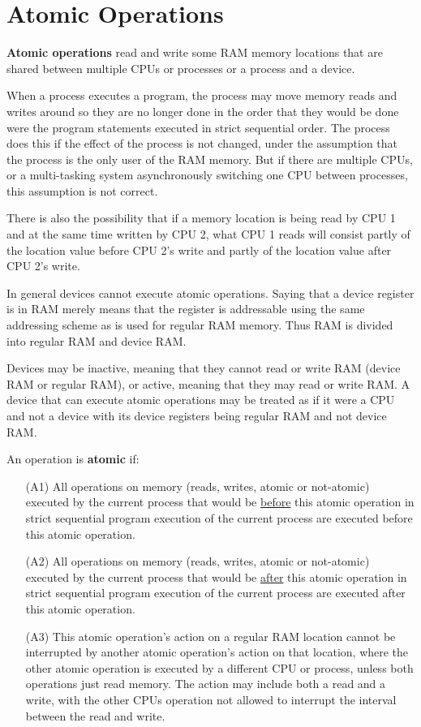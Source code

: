 \documentclass[12pt]{article}
\newcommand{\key}[1]{{\rm \bfseries #1}}
\newenvironment{indpar}[1][0.3in]%
	{\begin{list}{}%
		     {\setlength{\itemsep}{0in}%
		      \setlength{\topsep}{0in}%
		      \setlength{\parsep}{1ex}%
		      \setlength{\labelwidth}{#1}%
		      \setlength{\leftmargin}{#1}%
		      \addtolength{\leftmargin}{\labelsep}}%
	 \item}%
	{\end{list}}
\begin{document}
\section{Atomic Operations}
\label{ATOMIC-OPERATIONS}

\key{Atomic operations} read and write some RAM memory locations
that are shared between multiple CPUs or processes or a process and a device.

When a process executes a program, the process may move
memory reads and writes around so they are no longer
done in the order that they would be done were the program
statements executed in strict sequential order.  The
process does this if the effect of the process is not
changed, under the assumption that the process is the
only user of the RAM memory.  But if there are multiple CPUs,
or a multi-tasking system asynchronously switching one CPU
between processes, this assumption is not correct.

There is also the possibility that if a memory location is
being read by CPU 1 and at the same time written by CPU 2,
what CPU 1 reads will consist partly of the location value
before CPU 2's write and partly of the location value after
CPU 2's write.

In general devices cannot execute atomic operations.  Saying that a device
register is in RAM merely means that the register is addressable using the
same addressing scheme as is used for regular RAM memory.  Thus RAM is
divided into regular RAM and device RAM.

Devices may be
inactive, meaning that they cannot read or write RAM (device RAM or regular
RAM), or active, meaning that they may read or write RAM. 
A device that can execute atomic operations may be treated as if it were
a CPU and not a device with its device registers being regular RAM and
not device RAM.

An operation is \key{atomic} if:
\begin{indpar}
\begin{itemize}
\item [(A1)]
All operations on memory (reads, writes, atomic or not-atomic)
executed by the current process that would be \underline{before}
this atomic operation in strict sequential program execution
of the current process
are executed before this atomic operation.
\item [(A2)]
All operations on memory (reads, writes, atomic or not-atomic)
executed by the current process that would be \underline{after}
this atomic operation in strict sequential program execution
of the current process
are executed after this atomic operation.
\item [(A3)]
This atomic operation's action on a regular RAM location
cannot be interrupted by another atomic operation's action on that location,
where the other atomic operation is executed by a different CPU
or process, unless both operations just read memory.
The action may include both a read and a write, with the other CPUs
operation not allowed to interrupt the interval between the read and write.
\end{itemize}
\end{indpar}
\end{document}
